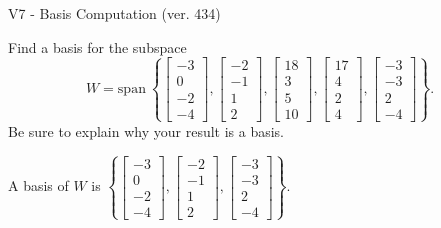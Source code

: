 \begin{exercise}
  \begin{exerciseTitle}V7 - Basis Computation (ver. 434)\end{exerciseTitle}
  \begin{exerciseStatement}
    Find a basis for the subspace 
\[W=\mathrm{span}\ \left\{\left[\begin{array}{r}
-3 \\
0 \\
-2 \\
-4
\end{array}\right] , \left[\begin{array}{r}
-2 \\
-1 \\
1 \\
2
\end{array}\right] , \left[\begin{array}{r}
18 \\
3 \\
5 \\
10
\end{array}\right] , \left[\begin{array}{r}
17 \\
4 \\
2 \\
4
\end{array}\right] , \left[\begin{array}{r}
-3 \\
-3 \\
2 \\
-4
\end{array}\right]\right\}.\]
 Be sure to explain why your result is a basis.


  \end{exerciseStatement}
  \begin{exerciseAnswer}
   A basis of \(W\) is  \(\left\{\left[\begin{array}{r}
-3 \\
0 \\
-2 \\
-4
\end{array}\right] , \left[\begin{array}{r}
-2 \\
-1 \\
1 \\
2
\end{array}\right] , \left[\begin{array}{r}
-3 \\
-3 \\
2 \\
-4
\end{array}\right]\right\}\).
  


  \end{exerciseAnswer}
\end{exercise}